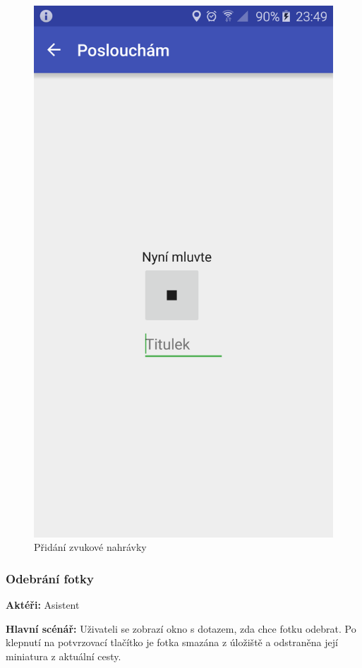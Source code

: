 \documentclass[czech,master,public,dept460,male,java,cpdeclaration]{diploma}
\newcommand{\usecase}[2]{\subsubsection{#1}\label{#2}}
\begin{document}
\begin{figure}[H]
\begin{minipage}{.5\textwidth}
                     \includegraphics[scale=0.14]{img/screen/nahravaninahravky.png}
             \caption{Přidání zvukové nahrávky}
             \label{fig:pridaninahravky}

       \end{minipage}
\end{figure}

\usecase{Odebrání fotky}{odebranifotky}
\textbf{Aktéři:} Asistent

\vspace{0.1cm}
\noindent
\textbf{Hlavní scénář:} Uživateli se zobrazí okno s dotazem, zda chce fotku odebrat. Po klepnutí na
potvrzovací tlačítko je fotka smazána z úložiště a odstraněna její miniatura z aktuální cesty.
\end{document}
